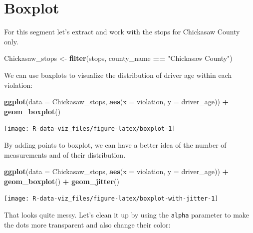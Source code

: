 \documentclass[]{book}
\newenvironment{Shaded}{\begin{snugshade}}{\end{snugshade}}
\newcommand{\KeywordTok}[1]{\textcolor[rgb]{0.13,0.29,0.53}{\textbf{#1}}}
\newcommand{\DataTypeTok}[1]{\textcolor[rgb]{0.13,0.29,0.53}{#1}}
\newcommand{\StringTok}[1]{\textcolor[rgb]{0.31,0.60,0.02}{#1}}
\newcommand{\OperatorTok}[1]{\textcolor[rgb]{0.81,0.36,0.00}{\textbf{#1}}}
\newcommand{\NormalTok}[1]{#1}
\theoremstyle{definition}
\theoremstyle{definition}
\theoremstyle{definition}
\theoremstyle{remark}
\begin{document}
\section{Boxplot}\label{boxplot}

For this segment let's extract and work with the stops for Chickasaw
County only.

\begin{Shaded}
\begin{Highlighting}[]
\NormalTok{Chickasaw_stops <-}\StringTok{ }\KeywordTok{filter}\NormalTok{(stops, county_name }\OperatorTok{==}\StringTok{ "Chickasaw County"}\NormalTok{)}
\end{Highlighting}
\end{Shaded}

We can use boxplots to visualize the distribution of driver age within
each violation:

\begin{Shaded}
\begin{Highlighting}[]
\KeywordTok{ggplot}\NormalTok{(}\DataTypeTok{data =}\NormalTok{ Chickasaw_stops, }\KeywordTok{aes}\NormalTok{(}\DataTypeTok{x =}\NormalTok{ violation, }\DataTypeTok{y =}\NormalTok{ driver_age)) }\OperatorTok{+}
\StringTok{    }\KeywordTok{geom_boxplot}\NormalTok{()}
\end{Highlighting}
\end{Shaded}

\texttt{[image: R-data-viz\_files/figure-latex/boxplot-1]}

By adding points to boxplot, we can have a better idea of the number of
measurements and of their distribution.

\begin{Shaded}
\begin{Highlighting}[]
\KeywordTok{ggplot}\NormalTok{(}\DataTypeTok{data =}\NormalTok{ Chickasaw_stops, }\KeywordTok{aes}\NormalTok{(}\DataTypeTok{x =}\NormalTok{ violation, }\DataTypeTok{y =}\NormalTok{ driver_age)) }\OperatorTok{+}
\StringTok{    }\KeywordTok{geom_boxplot}\NormalTok{() }\OperatorTok{+}
\StringTok{    }\KeywordTok{geom_jitter}\NormalTok{()}
\end{Highlighting}
\end{Shaded}

\texttt{[image: R-data-viz\_files/figure-latex/boxplot-with-jitter-1]}

That looks quite messy. Let's clean it up by using the \texttt{alpha}
parameter to make the dots more transparent and also change their color:
\end{document}
